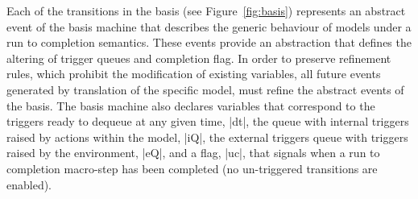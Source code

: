 

Each of the transitions in the basis (see Figure~\ref{fig:basis}) 
represents an abstract event of the basis machine that
describes the generic behaviour of models under a run to completion semantics.
These events provide an abstraction that defines the altering of trigger queues 
and completion flag. In order to preserve refinement rules, 
which prohibit the modification of existing variables,
all future events generated by translation of the specific \SCXML model, 
must refine the abstract events of the basis.
The basis machine also declares variables that correspond 
to the triggers ready to dequeue at any given time, |dt|,
the queue with internal triggers raised by actions within the model, |iQ|, 
the external triggers queue with triggers raised by the environment, |eQ|,
and a flag, |uc|, that signals when a run to completion macro-step has been completed 
(no un-triggered transitions are enabled). 


